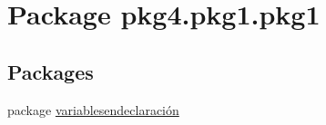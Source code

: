 \hypertarget{namespacepkg4_1_1pkg1_1_1pkg1}{}\section{Package pkg4.\+pkg1.\+pkg1}
\label{namespacepkg4_1_1pkg1_1_1pkg1}
\subsection*{Packages}
\begin{DoxyCompactItemize}
\item 
package \mbox{\hyperlink{namespacepkg4_1_1pkg1_1_1pkg1_1_1variablesendeclaraci_xC3_xB3n}{variablesendeclaración}}
\end{DoxyCompactItemize}
